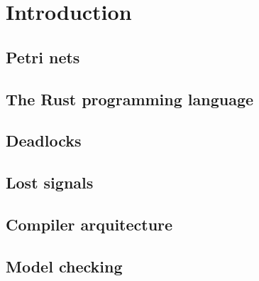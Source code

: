 \chapter{Introduction}

\section{Petri nets}

\section{The Rust programming language}

\section{Deadlocks}

\section{Lost signals}

\section{Compiler arquitecture}

\section{Model checking}

\bigskip